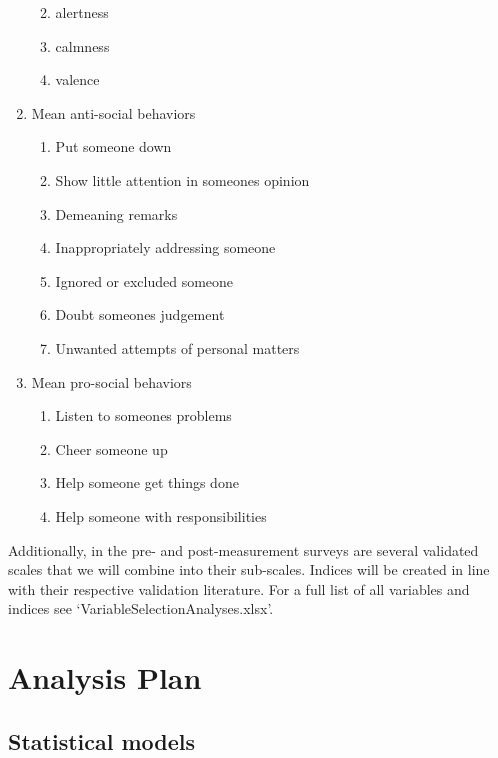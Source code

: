 \documentclass[]{article}
\providecommand{\tightlist}{%
\setlength{\itemsep}{0pt}\setlength{\parskip}{0pt}}
\begin{document}
\begin{enumerate}
  \begin{enumerate}
  \def\labelenumii{\alph{enumii}.}
  \tightlist
  \item
    alertness
  \item
    calmness
  \item
    valence
  \end{enumerate}
\item
  Mean anti-social behaviors

  \begin{enumerate}
  \def\labelenumii{\alph{enumii}.}
  \tightlist
  \item
    Put someone down
  \item
    Show little attention in someones opinion
  \item
    Demeaning remarks
  \item
    Inappropriately addressing someone
  \item
    Ignored or excluded someone
  \item
    Doubt someones judgement
  \item
    Unwanted attempts of personal matters
  \end{enumerate}
\item
  Mean pro-social behaviors

  \begin{enumerate}
  \def\labelenumii{\alph{enumii}.}
  \tightlist
  \item
    Listen to someones problems
  \item
    Cheer someone up
  \item
    Help someone get things done
  \item
    Help someone with responsibilities
  \end{enumerate}
\end{enumerate}

Additionally, in the pre- and post-measurement surveys are several
validated scales that we will combine into their sub-scales. Indices
will be created in line with their respective validation literature. For
a full list of all variables and indices see
`VariableSelectionAnalyses.xlsx'.

\hypertarget{analysis-plan}{%
\section{Analysis Plan}\label{analysis-plan}}

\hypertarget{statistical-models}{%
\subsection{Statistical models}\label{statistical-models}}
\end{document}
